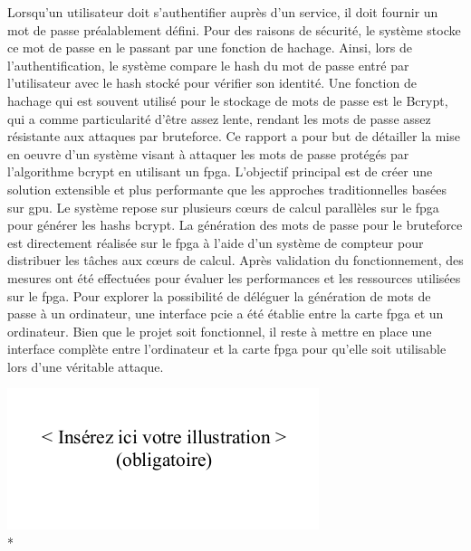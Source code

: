 \begin{spacing}{0.956}
\vspace{0.5cm}

Lorsqu'un utilisateur doit s'authentifier auprès d'un service, il doit fournir un mot de passe préalablement défini. Pour des raisons de sécurité, le système stocke ce mot de passe en le passant par une fonction de hachage. Ainsi, lors de l'authentification, le système compare le hash du mot de passe entré par l'utilisateur avec le hash stocké pour vérifier son identité. Une fonction de hachage qui est souvent utilisé pour le stockage de mots de passe est le Bcrypt, qui a comme particularité d'être assez lente, rendant les mots de passe assez résistante aux attaques par bruteforce. Ce rapport a pour but de détailler la mise en oeuvre d'un système visant à attaquer les mots de passe protégés par l'algorithme bcrypt en utilisant un \gls{fpga}. L'objectif principal est de créer une solution extensible et plus performante que les approches traditionnelles basées sur \gls{gpu}. Le système repose sur plusieurs cœurs de calcul parallèles sur le \gls{fpga} pour générer les hashs bcrypt. La génération des mots de passe pour le bruteforce est directement réalisée sur le \gls{fpga} à l'aide d'un système de compteur pour distribuer les tâches aux cœurs de calcul. Après validation du fonctionnement, des mesures ont été effectuées pour évaluer les performances et les ressources utilisées sur le \gls{fpga}. Pour explorer la possibilité de déléguer la génération de mots de passe à un ordinateur, une interface \gls{pcie} a été établie entre la carte \gls{fpga} et un ordinateur. Bien que le projet soit fonctionnel, il reste à mettre en place une interface complète entre l'ordinateur et la carte \gls{fpga} pour qu'elle soit utilisable lors d'une véritable attaque.

\vfill
\begin{center}
	{\includegraphics[]{template/images/abstract/image}}\\*
\vfill


\end{center}
\end{spacing}

